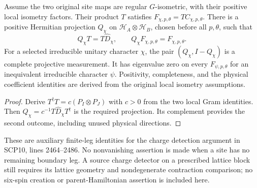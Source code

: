 \begin{lemma}
    \label{thm:peps_regular_two_site_physical_charge_measurement}
    Assume the two original site maps are regular $G$-isometric, with their positive
    local isometry factors. Their product $T$ satisfies
    $F_{\chi,p,\theta}=T C_{\chi,p,\theta}$. There is a positive Hermitian projection
    $Q_\chi$ on $\mathcal H_A\otimes\mathcal H_B$, chosen before all $p,\theta$, such that
    \[
        Q_\chi T=T\widehat D_\chi,
        \qquad Q_\chi F_{\chi,p,\theta}=F_{\chi,p,\theta}.
    \]
    For a selected irreducible unitary character $\chi$, the pair
    $(Q_\chi,I-Q_\chi)$ is a complete projective measurement. It has eigenvalue
    zero on every $F_{\psi,p,\theta}$ for an inequivalent irreducible character
    $\psi$. Positivity, completeness, and the physical coefficient identities are
    derived from the original local isometry assumptions.
    \leanok
\end{lemma}
\begin{proof}\leanok
    Derive $T^\dagger T=c(P_I\otimes P_J)$ with $c>0$ from the two local Gram
    identities. Then $Q_\chi=c^{-1}T\widehat D_\chi T^\dagger$ is the required
    projection. Its complement provides the second outcome, including unused
    physical directions.
\end{proof}

These are auxiliary finite-leg identities for the charge detection argument in
SCP10, lines 2464--2486. No nonvanishing assertion is made when a site has no
remaining boundary leg. A source charge detector on a prescribed lattice block
still requires its lattice geometry and nondegenerate contraction comparison;
no six-spin creation or parent-Hamiltonian assertion is included here.


